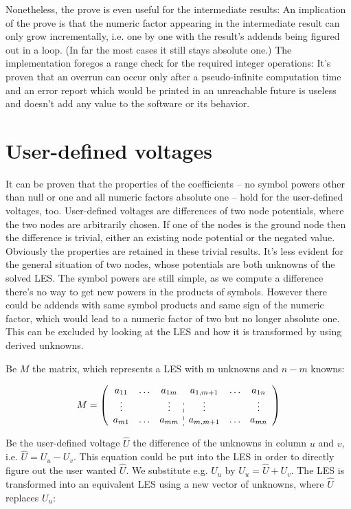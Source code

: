 Nonetheless, the prove is even useful for the intermediate results: An
implication of the prove is that the numeric factor appearing in the
intermediate result can only grow incrementally, i.e. one by one with the
result's addends being figured out in a loop. (In far the most cases it
still stays absolute one.) The implementation foregos a range check for
the required integer operations: It's proven that an overrun can occur
only after a pseudo-infinite computation time and an error report which
would be printed in an unreachable future is useless and doesn't add any
value to the software or its behavior.


\section{User-defined voltages}

It can be proven that the properties of the coefficients -- no symbol
powers other than null or one and all numeric factors absolute one -- hold
for the user-defined voltages, too. User-defined voltages are differences
of two node potentials, where the two nodes are arbitrarily chosen. If one
of the nodes is the ground node then the difference is trivial, either an
existing node potential or the negated value. Obviously the properties are
retained in these trivial results. It's less evident for the general
situation of two nodes, whose potentials are both unknowns of the solved
LES. The symbol powers are still simple, as we compute a difference
there's no way to get new powers in the products of symbols. However there
could be addends with same symbol products and same sign of the numeric
factor, which would lead to a numeric factor of two but no longer absolute
one. This can be excluded by looking at the LES and how it is transformed
by using derived unknowns.

Be $M$ the matrix, which represents a LES with m unknowns and $n-m$
knowns:

\begin{equation*}
M =
\left(
\begin{array}{ccc:ccc}
a_{11} & \ldots & a_{1m} & a_{1, m+1} & \ldots & a_{1n} \\
\vdots &        & \vdots & \vdots     &        & \vdots \\
a_{m1} & \ldots & a_{mm} & a_{m, m+1} & \ldots & a_{mn}
\end{array}
\right)
\end{equation*}

Be the user-defined voltage $\hat U$ the difference of the unknowns in column $u$
and $v$, i.e. $\hat U = U_u - U_v$. This equation could be put into the LES in
order to directly figure out the user wanted $\hat U$. We substitute e.g.
$U_u$ by $U_u = \hat U + U_v$. The LES is transformed into an equivalent
LES using a new vector of unknowns, where $\hat U$ replaces $U_u$:

